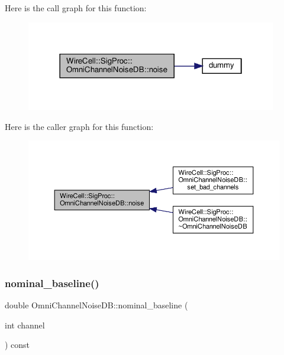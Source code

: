 Here is the call graph for this function\+:
\nopagebreak
\begin{figure}[H]
\begin{center}
\leavevmode
\includegraphics[width=310pt]{class_wire_cell_1_1_sig_proc_1_1_omni_channel_noise_d_b_a125b09b4d7d5cb973ae418936343bf4a_cgraph}
\end{center}
\end{figure}
Here is the caller graph for this function\+:
\nopagebreak
\begin{figure}[H]
\begin{center}
\leavevmode
\includegraphics[width=350pt]{class_wire_cell_1_1_sig_proc_1_1_omni_channel_noise_d_b_a125b09b4d7d5cb973ae418936343bf4a_icgraph}
\end{center}
\end{figure}
\mbox{\label{class_wire_cell_1_1_sig_proc_1_1_omni_channel_noise_d_b_a7d762e341143dea15eb2d8f57aac9c86}} 
\subsubsection{\texorpdfstring{nominal\+\_\+baseline()}{nominal\_baseline()}}
{\footnotesize\ttfamily double Omni\+Channel\+Noise\+D\+B\+::nominal\+\_\+baseline (\begin{DoxyParamCaption}\item[{int}]{channel }\end{DoxyParamCaption}) const\hspace{0.3cm}{\ttfamily [virtual]}}



